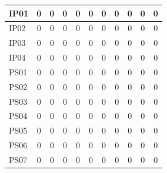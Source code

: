 \documentclass [10pt]{article}
\begin{document}
\begin{longtable}{ | p{} | c | c | c | c | c | c | c | c | c | c | }
	IP01 & 0 & 0 & 0 & 0 & 0 & 0 & 0 & 0 & 0 & 0 \\ \hline
	IP02 & 0 & 0 & 0 & 0 & 0 & 0 & 0 & 0 & 0 & 0 \\ \hline
	IP03 & 0 & 0 & 0 & 0 & 0 & 0 & 0 & 0 & 0 & 0 \\ \hline
	IP04 & 0 & 0 & 0 & 0 & 0 & 0 & 0 & 0 & 0 & 0 \\ \hline
	PS01 & 0 & 0 & 0 & 0 & 0 & 0 & 0 & 0 & 0 & 0 \\ \hline
	PS02 & 0 & 0 & 0 & 0 & 0 & 0 & 0 & 0 & 0 & 0 \\ \hline
	PS03 & 0 & 0 & 0 & 0 & 0 & 0 & 0 & 0 & 0 & 0 \\ \hline
	PS04 & 0 & 0 & 0 & 0 & 0 & 0 & 0 & 0 & 0 & 0 \\ \hline
	PS05 & 0 & 0 & 0 & 0 & 0 & 0 & 0 & 0 & 0 & 0 \\ \hline
	PS06 & 0 & 0 & 0 & 0 & 0 & 0 & 0 & 0 & 0 & 0 \\ \hline
	PS07 & 0 & 0 & 0 & 0 & 0 & 0 & 0 & 0 & 0 & 0 \\ \hline
\end{longtable}
\end{document}
